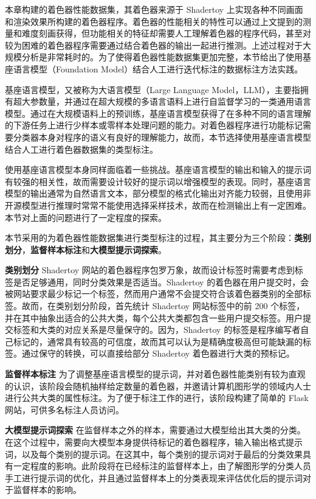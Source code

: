 {\added 本章构建的着色器性能数据集，其着色器来源于 Shadertoy 上实现各种不同画面和渲染效果所构建的着色器程序。着色器的性能相关的特性可以通过上文提到的测量和难度刻画获得，但功能相关的特征却需要人工理解着色器的程序代码，甚至对较为困难的着色器程序需要通过结合着色器的输出一起进行推测。上述过程对于大规模分析是非常耗时的。为了使得着色器性能数据集更加完整，本节给出了使用基座语言模型（Foundation Model）结合人工进行迭代标注的数据标注方法实践。

基座语言模型，又被称为大语言模型（Large Language Model，LLM），主要指拥有超大参数量，并通过在超大规模的多语言语料上进行自监督学习的一类通用语言模型。通过在大规模语料上的预训练，基座语言模型获得了在多种不同的语言理解的下游任务上进行少样本或零样本处理问题的能力。对着色器程序进行功能标记需要分类器本身对程序的语义有良好的理解能力，故而，本节选择使用基座语言模型结合人工进行着色器数据集的类型标注。

使用基座语言模型本身同样面临着一些挑战。基座语言模型的输出和输入的提示词有较强的相关性，故而需要设计较好的提示词以增强模型的表现。同时，基座语言模型的输出通常为自然语言文本，部分模型的格式化输出对齐能力较弱，且使用非开源模型进行推理时常常不能使用选择采样技术，故而在检测输出上有一定困难。本节对上面的问题进行了一定程度的探索。

本节采用的为着色器性能数据集进行类型标注的过程，其主要分为三个阶段：{\bf 类别划分}，{\bf 监督样本标注}和{\bf 大模型提示词探索}。

{\bf 类别划分} Shadertoy 网站的着色器程序包罗万象，故而设计标签时需要考虑到标签是否足够通用，同时分类效果是否适当。Shadertoy 的着色器在用户提交时，会被网站要求最少标记一个标签，然而用户通常不会提交符合该着色器类别的全部标签。故而，在类别划分阶段，首先统计 Shadertoy 网站标签中的前 200 个标签，并在其中抽象出适合的公共大类，每个公共大类都包含一些用户提交标签。用户提交标签和大类的对应关系是尽量保守的。因为，Shadertoy 的标签是程序编写者自己标记的，通常具有较高的可信度，故而其可以认为是精确度极高但可能缺漏的标签。通过保守的转换，可以直接给部分 Shadertoy 着色器进行大类的预标记。

{\bf 监督样本标注} 为了调整基座语言模型的提示词，并对着色器性能类别有较为直观的认识，该阶段会随机抽样给定数量的着色器，并邀请计算机图形学的领域内人士进行公共大类的属性标注。为了便于标注工作的进行，该阶段构建了简单的 Flask 网站，可供多名标注人员访问。

{\bf 大模型提示词探索} 在监督样本之外的样本，需要通过大模型给出其大类的分类。在这个过程中，需要向大模型本身提供待标记的着色器程序，输入输出格式提示词，以及每个类别的提示词。在这其中，每个类别的提示词对于最后的分类效果具有一定程度的影响。此阶段将在已经标注的监督样本上，由了解图形学的分类人员手工进行提示词的优化，并且通过监督样本上的分类表现来评估优化后的提示词对于监督样本的影响。

}

